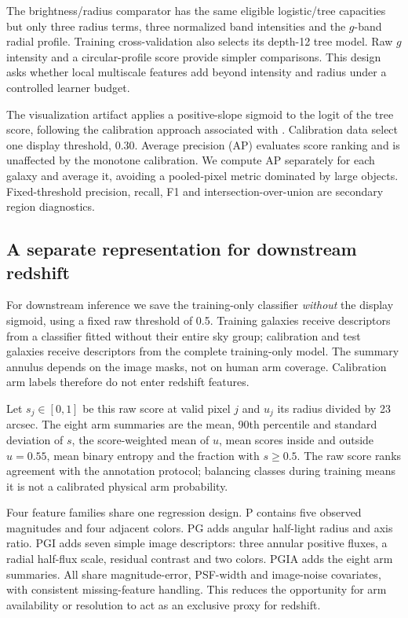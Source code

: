 \documentclass[11pt]{article}
\begin{document}
The brightness/radius comparator has the same eligible logistic/tree capacities
but only three radius terms, three normalized band intensities and the $g$-band
radial profile. Training cross-validation also selects its depth-12 tree model.
Raw $g$ intensity and a circular-profile score provide simpler comparisons.
This design asks whether local multiscale features add beyond intensity and
radius under a controlled learner budget.

The visualization artifact applies a positive-slope sigmoid to the logit of
the tree score, following the calibration approach associated with
\citet{platt1999}. Calibration data select one display threshold, 0.30.
Average precision (AP) evaluates score ranking and is unaffected by the monotone
calibration. We compute AP separately for each galaxy and average it, avoiding
a pooled-pixel metric dominated by large objects. Fixed-threshold precision,
recall, F1 and intersection-over-union are secondary region diagnostics.

\subsection{A separate representation for downstream redshift}
For downstream inference we save the training-only classifier \emph{without}
the display sigmoid, using a fixed raw threshold of 0.5. Training galaxies
receive descriptors from a classifier fitted without their entire sky group;
calibration and test galaxies receive descriptors from the complete training-only
model. The summary annulus depends on the image masks, not on human arm coverage.
Calibration arm labels therefore do not enter redshift features.

Let $s_j\in[0,1]$ be this raw score at valid pixel $j$ and $u_j$ its radius
divided by 23 arcsec. The eight arm summaries are the mean, 90th percentile and
standard deviation of $s$, the score-weighted mean of $u$, mean scores inside
and outside $u=0.55$, mean binary entropy and the fraction with $s\geq0.5$.
The raw score ranks agreement with the annotation protocol; balancing classes
during training means it is not a calibrated physical arm probability.

Four feature families share one regression design. P contains five observed
magnitudes and four adjacent colors. PG adds angular half-light radius and axis
ratio. PGI adds seven simple image descriptors: three annular positive fluxes,
a radial half-flux scale, residual contrast and two colors. PGIA adds the eight
arm summaries. All share magnitude-error, PSF-width and image-noise covariates,
with consistent missing-feature handling. This reduces the opportunity for arm
availability or resolution to act as an exclusive proxy for redshift.
\end{document}

